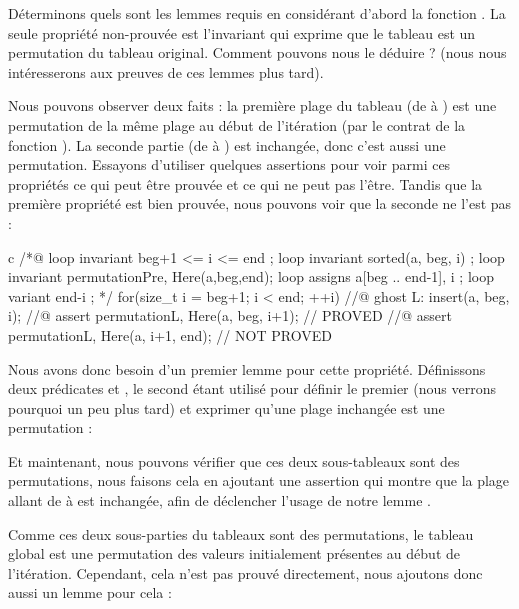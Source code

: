 Déterminons quels sont les lemmes requis en considérant d'abord la fonction
. La seule propriété non-prouvée est l'invariant qui
exprime que le tableau est un permutation du tableau original. Comment pouvons
nous le déduire ? (nous nous intéresserons aux preuves de ces lemmes plus tard).



Nous pouvons observer deux faits : la première plage du tableau (de
 à ) est une permutation de la même plage au
début de l'itération (par le contrat de la fonction ). La
seconde partie (de  à ) est inchangée, donc
c'est aussi une permutation. Essayons d'utiliser quelques assertions pour voir
parmi ces propriétés ce qui peut être prouvée et ce qui ne peut pas l'être.
Tandis que la première propriété est bien prouvée, nous pouvons voir que la
seconde ne l'est pas :



\begin{CodeBlock}{c}
  /*@
    loop invariant beg+1 <= i <= end ;
    loop invariant sorted(a, beg, i) ;
    loop invariant permutation{Pre, Here}(a,beg,end);
    loop assigns a[beg .. end-1], i ;
    loop variant end-i ;
  */
  for(size_t i = beg+1; i < end; ++i) {
    //@ ghost L:
    insert(a, beg, i);
    //@ assert permutation{L, Here}(a, beg, i+1); // PROVED
    //@ assert permutation{L, Here}(a, i+1, end); // NOT PROVED
  }
\end{CodeBlock}


Nous avons donc besoin d'un premier lemme pour cette propriété. Définissons
deux prédicates  et , le second
étant utilisé pour définir le premier (nous verrons pourquoi un peu plus
tard) et exprimer qu'une plage inchangée est une permutation :





Et maintenant, nous pouvons vérifier que ces deux sous-tableaux sont des
permutations, nous faisons cela en ajoutant une assertion qui montre que la
plage allant de  à  est inchangée, afin de
déclencher l'usage de notre lemme .




Comme ces deux sous-parties du tableaux sont des permutations, le tableau
global est une permutation des valeurs initialement présentes au début de
l'itération. Cependant, cela n'est pas prouvé directement, nous ajoutons
donc aussi un lemme pour cela :


